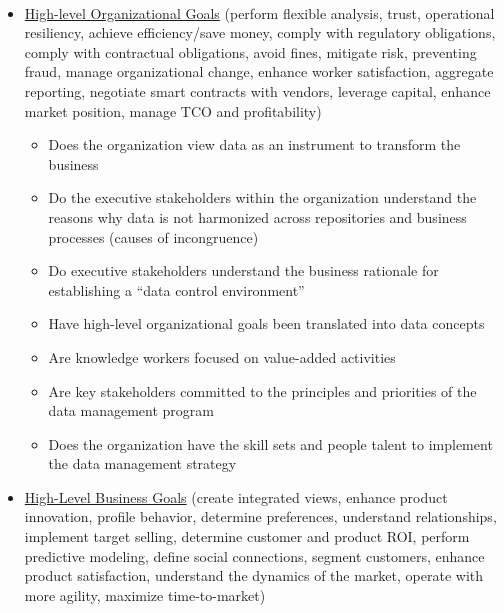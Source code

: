 ~\\[0.5in]

\begin{itemize}
  \item \ul{High-level Organizational Goals} (perform flexible analysis, trust, operational resiliency, achieve efficiency/save money, comply with regulatory obligations, comply with contractual obligations, avoid fines, mitigate risk, preventing fraud, manage organizational change, enhance worker satisfaction, aggregate reporting, negotiate smart contracts with vendors, leverage capital, enhance market position, manage TCO and profitability)

    \begin{itemize}
      \item Does the organization view data as an instrument to transform the business
      \item Do the executive stakeholders within the organization understand the reasons why data is not harmonized across repositories and business processes (causes of incongruence)
      \item Do executive stakeholders understand the business rationale for establishing a “data control environment”
      \item Have high-level organizational goals been translated into data concepts
      \item Are knowledge workers focused on value-added activities
      \item Are key stakeholders committed to the principles and priorities of the data management program
      \item Does the organization have the skill sets and people talent to implement the data management strategy
    \end{itemize}

  \item \ul{High-Level Business Goals} (create integrated views, enhance product innovation, profile behavior, determine preferences, understand relationships, implement target selling, determine customer and product ROI, perform predictive modeling, define social connections, segment customers, enhance product satisfaction, understand the dynamics of the market, operate with more agility, maximize time-to-market)


\end{itemize}
